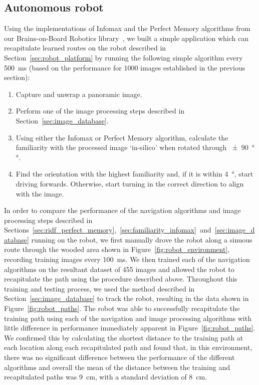 \documentclass[letterpaper]{article}
\begin{document}
\subsection{Autonomous robot}
Using the implementations of Infomax and the Perfect Memory algorithms from our Brains-on-Board Robotics library~\citep{Dewar2017}, we built a simple application which can recapitulate learned routes on the robot described in Section~\ref{sec:robot_platform} by running the following simple algorithm every \SI{500}{\milli\second} (based on the performance for 1000 images established in the previous section):
%
\begin{enumerate}
    \item Capture and unwrap a panoramic image.
    \item Perform one of the image processing steps described in Section~\ref{sec:image_database}.
    \item Using either the Infomax or Perfect Memory algorithm, calculate the familiarity with the processed image ‘in-silico’ when rotated through \SI{\pm 90}{\degree}°.
    \item Find the orientation with the highest familiarity and, if it is within \SI{4}{\degree}, start driving forwards. Otherwise, start turning in the correct direction to align with the image.
\end{enumerate}
%
In order to compare the performance of the navigation algorithms and image processing steps described in Sections~\ref{sec:ridf_perfect_memory},~\ref{sec:familiarity_infomax}~and~\ref{sec:image_database} running on the robot, we first manually drove the robot along a sinuous route through the wooded area shown in Figure~\ref{fig:robot_environment}, recording training images every \SI{100}{\milli\second}.
We then trained each of the navigation algorithms on the resultant dataset of \num{455} images and allowed the robot to recapitulate the path using the procedure described above.
Throughout this training and testing process, we used the method described in Section~\ref{sec:image_database} to track the robot, resulting in the data shown in Figure~\ref{fig:robot_paths}.
The robot was able to successfully recapitulate the training path using each of the navigation and image processing algorithms with little difference in performance immediately apparent in Figure~\ref{fig:robot_paths}.
We confirmed this by calculating the shortest distance to the training path at each location along each recapitulated path and found that, in this environment, there was no significant difference between the performance of the different algorithms and overall the mean of the distance between the training and recapitulated paths was \SI{9}{\centi\metre}, with a standard deviation of \SI{8}{\centi\metre}.
\end{document}

